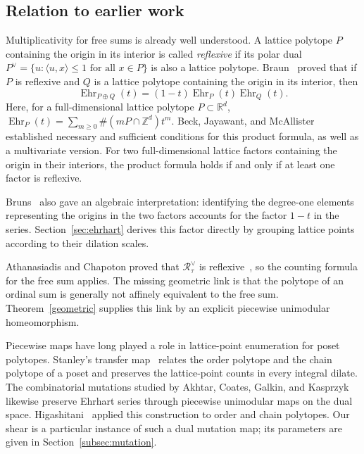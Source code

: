\documentclass[11pt,reqno]{amsart}
\numberwithin{equation}{section}
\theoremstyle{definition}
\theoremstyle{remark}
\theoremstyle{definition}
\newcommand{\Rpoly}[1]{\mathcal R_{#1}^{\vee}}
\DeclareMathOperator{\Ehr}{Ehr}
\begin{document}
\subsection{Relation to earlier work}
Multiplicativity for free sums is already well understood. A lattice polytope $P$ containing the origin in its interior is called
\emph{reflexive} if its polar dual $P^\vee=\{u:\langle u,x\rangle\le1\text{ for all }x\in P\}$
is also a lattice polytope. Braun~\cite[Theorem~1]{BRAUN} proved that if $P$ is reflexive and $Q$ is a lattice polytope containing the origin in its interior, then
\[
 \Ehr_{P\oplus Q}(t)=(1-t)\Ehr_P(t)\Ehr_Q(t).
\]
Here, for a full-dimensional lattice polytope $P\subset\mathbb R^d$, $\Ehr_P(t)=\sum_{m\ge0}\#(mP\cap\mathbb Z^d)t^m$. Beck, Jayawant, and McAllister~\cite[Theorems~1.3 and~1.4]{BJM} established necessary and sufficient conditions for this product formula, as well as a multivariate version. For two full-dimensional lattice factors containing the origin in their interiors, the product formula holds if and only if at least one factor is reflexive.

Bruns~\cite[Sections~1 and~3]{BRUNS} also gave an algebraic interpretation: identifying the degree-one elements representing the origins in the two factors accounts for the factor $1-t$ in the series. Section~\ref{sec:ehrhart} derives this factor directly by grouping lattice points according to their dilation scales.

Athanasiadis and Chapoton proved that $\Rpoly{\tau}$ is reflexive~\cite[Proposition~6.1]{AC}, so the counting formula for the free sum applies. The missing geometric link is that the polytope of an ordinal sum is generally not affinely equivalent to the free sum. Theorem~\ref{geometric} supplies this link by an explicit piecewise unimodular homeomorphism.

Piecewise maps have long played a role in lattice-point enumeration for poset polytopes. Stanley's transfer map~\cite[Theorem~3.2]{ST86} relates the order polytope and the chain polytope of a poset and preserves the lattice-point counts in every integral dilate. The combinatorial mutations studied by Akhtar, Coates, Galkin, and Kasprzyk~\cite[Section~3]{ACGK} likewise preserve Ehrhart series through piecewise unimodular maps on the dual space. Higashitani~\cite[Definition~3.1 and Theorem~4.1]{HIG} applied this construction to order and chain polytopes. Our shear is a particular instance of such a dual mutation map; its parameters are given in Section~\ref{subsec:mutation}.
\end{document}

